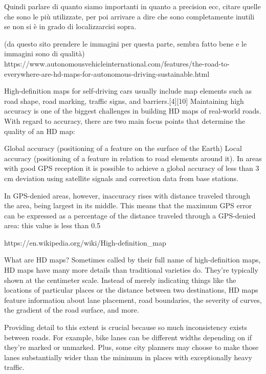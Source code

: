 Quindi parlare di quanto siamo importanti in quanto a precision ecc, citare quelle che sono le più utilizzate, per poi arrivare a dire che sono completamente inutili se non si è in grado di localizzarcisi sopra. 

(da questo sito prendere le immagini per questa parte, sembra fatto bene e le immagini sono di qualità)
https://www.autonomousvehicleinternational.com/features/the-road-to-everywhere-are-hd-maps-for-autonomous-driving-sustainable.html












High-definition maps for self-driving cars usually include map elements such as road shape, road marking, traffic signs, and barriers.[4][10] Maintaining high accuracy is one of the biggest challenges in building HD maps of real-world roads. With regard to accuracy, there are two main focus points that determine the quality of an HD map:

Global accuracy (positioning of a feature on the surface of the Earth)
Local accuracy (positioning of a feature in relation to road elements around it).
In areas with good GPS reception it is possible to achieve a global accuracy of less than 3 cm deviation using satellite signals and correction data from base stations.

In GPS-denied areas, however, inaccuracy rises with distance traveled through the area, being largest in its middle. This means that the maximum GPS error can be expressed as a percentage of the distance traveled through a GPS-denied area: this value is less than 0.5%

https://en.wikipedia.org/wiki/High-definition_map





What are HD maps?
Sometimes called by their full name of high-definition maps, HD maps have many more details than traditional varieties do. They’re typically shown at the centimeter scale. Instead of merely indicating things like the locations of particular places or the distance between two destinations, HD maps feature information about lane placement, road boundaries, the severity of curves, the gradient of the road surface, and more.

Providing detail to this extent is crucial because so much inconsistency exists between roads. For example, bike lanes can be different widths depending on if they’re marked or unmarked. Plus, some city planners may choose to make those lanes substantially wider than the minimum in places with exceptionally heavy traffic.

